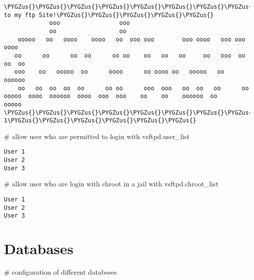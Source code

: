 \documentclass[letterpaper,10pt,english]{sphinxmanual}
\def\PYGZus{\char`\_}
\begin{document}
\begin{Verbatim}[commandchars=\\\{\}]
      \PYGZus{}\PYGZus{}\PYGZus{}\PYGZus{}\PYGZus{}\PYGZus{}\PYGZus{}\PYGZus{}\PYGZus{}\PYGZus{}\PYGZus{}\PYGZus{}\PYGZus{}\PYGZus{}\PYGZus{}\PYGZus{}\PYGZus{}\PYGZus{}\PYGZus{}\PYGZus{}\PYGZus{}\PYGZus{}\PYGZus{}\PYGZus{}\PYGZus{}\PYGZus{}\PYGZus{}\PYGZus{}\PYGZus{}\PYGZus{}\PYGZus{}\PYGZus{}\PYGZus{}\PYGZus{}\PYGZus{}\PYGZus{}\PYGZus{}\PYGZus{}\PYGZus{}\PYGZus{}\PYGZus{}\PYGZus{}\PYGZus{}\PYGZus{}Welcome to my ftp Site!\PYGZus{}\PYGZus{}\PYGZus{}\PYGZus{}\PYGZus{}
             ooo                 ooo
             oo                  oo
    ooooo   oo   oooo    oooo   oo  ooo ooo        ooo oooo   ooo ooo   oooo
   oo      oo      oo  oo      oo oo    oo   oo   oo     oo   ooo  oo oo  oo
   ooo    oo   ooooo  oo      oooo      oo oooo oo   ooooo   oo      oooooo
    oo   oo  oo  oo  oo      oo oo      ooo  ooo   oo  oo   oo      oo
ooooo  oooo  oooooo  oooo  ooo  ooo    oo    oo    oooooo  oo       ooooo
\PYGZus{}\PYGZus{}\PYGZus{}\PYGZus{}\PYGZus{}\PYGZus{}\PYGZus{}\PYGZus{}\PYGZus{}\PYGZus{}\PYGZus{}\PYGZus{}\PYGZus{}\PYGZus{}\PYGZus{}\PYGZus{}\PYGZus{}\PYGZus{}\PYGZus{}\PYGZus{}\PYGZus{}\PYGZus{}\PYGZus{}\PYGZus{}\PYGZus{}\PYGZus{}\PYGZus{}\PYGZus{}\PYGZus{}\PYGZus{}\PYGZus{}\PYGZus{}\PYGZus{}\PYGZus{}\PYGZus{}\PYGZus{}\PYGZus{}\PYGZus{}\PYGZus{}\PYGZus{}\PYGZus{}\PYGZus{}\PYGZus{}\PYGZus{}\PYGZus{}\PYGZus{}\PYGZus{}\PYGZus{}\PYGZus{}\PYGZus{}\PYGZus{}\PYGZus{}\PYGZus{}\PYGZus{}\PYGZus{}\PYGZus{}\PYGZus{}\PYGZus{}\PYGZus{}\PYGZus{}\PYGZus{}User 1\PYGZus{}\PYGZus{}\PYGZus{}\PYGZus{}\PYGZus{}\PYGZus{}
\end{Verbatim}

\# allow user who are permitted to login with vsftpd.user\_list

\begin{Verbatim}[commandchars=\\\{\}]
User 1
User 2
User 3
\end{Verbatim}

\# allow user who are login with chroot in a jail with vsftpd.chroot\_list

\begin{Verbatim}[commandchars=\\\{\}]
User 1
User 2
User 3
\end{Verbatim}


\section{Databases}
\label{sdocs/databases/databases::doc}\label{sdocs/databases/databases:databases}
\# configuration of different databeses
\end{document}

